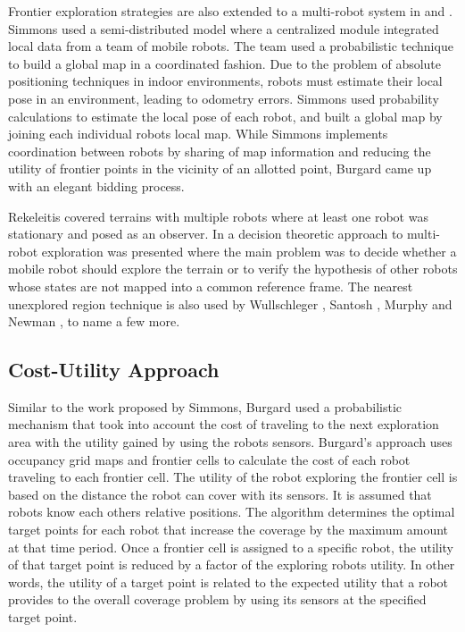 Frontier exploration strategies are also extended to a multi-robot system in \cite{Simmons2000} and \cite{Burgard2005}. Simmons \cite{Simmons2000} used a semi-distributed model where a centralized module integrated local data from a team of mobile robots. The team used a probabilistic technique to build a global map in a coordinated fashion. Due to the problem of absolute positioning techniques in indoor environments, robots must estimate their local pose in an environment, leading to odometry errors. Simmons used probability calculations to estimate the local pose of each robot, and built a global map by joining each individual robots local map. 
While Simmons \cite{Simmons2000} implements coordination between robots by sharing of map information and reducing the utility of frontier points in the vicinity of an allotted point, Burgard \cite{Burgard2005} came up with an elegant bidding process. 

Rekeleitis \cite{Rekeleitis2000} covered terrains with multiple robots where at least one robot was stationary and posed as an observer. In \cite{Fox2006} a decision theoretic approach to multi-robot exploration was presented where the
main problem was to decide whether a mobile robot should explore the terrain or to verify the hypothesis of other robots whose states are not mapped into a common reference frame. The nearest unexplored region technique is also used by Wullschleger \cite{Wullschleger99}, Santosh \cite{Santosh2008}, Murphy and Newman \cite{Murphy2008}, to name a few more.


\subsection{Cost-Utility Approach}


Similar to the work proposed by Simmons, Burgard \cite{Burgard2000} used a probabilistic mechanism that took into account the cost of traveling to the next exploration area with the utility gained by using the robots sensors. Burgard's approach uses occupancy grid maps and frontier cells to calculate the cost of each robot traveling to each frontier cell. The utility of the robot exploring the frontier cell is based on the distance the robot can cover with its sensors. It is assumed that robots know each others relative positions.
The algorithm determines the optimal target points for each robot that increase the coverage by the maximum amount at that time period. Once a frontier cell is assigned to a specific robot, the utility of that target point is reduced by a factor of the exploring robots utility. In other words, the utility of a target point is related to the expected utility that a robot provides to the overall coverage problem by using its sensors at the specified target point.




